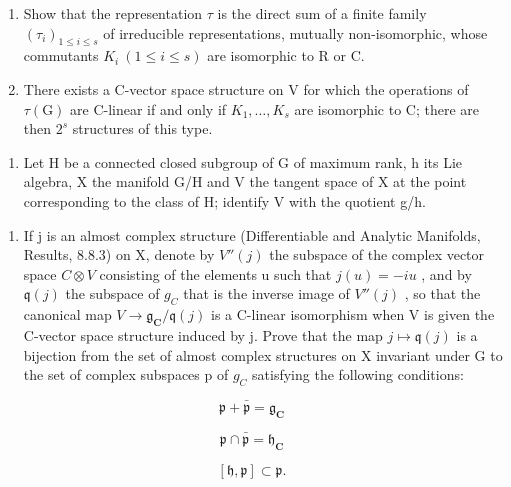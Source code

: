 \begin{enumerate}
\def\labelenumi{\alph{enumi})}
\item
  Show that the representation \(\tau\) is the direct sum of a finite family \((\tau_{i})_{1\leq i\leq s}\) of irreducible representations, mutually non-isomorphic, whose commutants \(K_{i}\ (1\leq i\leq s)\) are isomorphic to R or C.
\item
  There exists a C-vector space structure on V for which the operations of \(\tau(\mathrm{G})\) are C-linear if and only if \(K_{1},\ldots,K_{s}\) are isomorphic to C; there are then \(2^{s}\) structures of this type.
\end{enumerate}

\begin{enumerate}
\def\labelenumi{\arabic{enumi})}
\setcounter{enumi}{7}
\tightlist
\item
  Let H be a connected closed subgroup of G of maximum rank, h its Lie algebra, X the manifold G/H and V the tangent space of X at the point corresponding to the class of H; identify V with the quotient g/h.
\end{enumerate}

\begin{enumerate}
\def\labelenumi{\alph{enumi})}
\tightlist
\item
  If j is an almost complex structure (Differentiable and Analytic Manifolds, Results, 8.8.3) on X, denote by \(V''(j)\) the subspace of the complex vector space \(C \otimes V\) consisting of the elements u such that \(j(u) = -iu\) , and by \(\mathfrak{q}(j)\) the subspace of \(g_{C}\) that is the inverse image of \(V''(j)\) , so that the canonical map \(V \to \mathfrak{g}_{\mathbf{C}} / \mathfrak{q}(j)\) is a C-linear isomorphism when V is given the C-vector space structure induced by j. Prove that the map \(j \mapsto \mathfrak{q}(j)\) is a bijection from the set of almost complex structures on X invariant under G to the set of complex subspaces p of \(g_{C}\) satisfying the following conditions:
\end{enumerate}

\[
\mathfrak {p} + \bar {\mathfrak {p}} = \mathfrak {g} _ {\mathbf {C}}\tag{1}
\]

\[
\mathfrak {p} \cap \bar {\mathfrak {p}} = \mathfrak {h} _ {\mathbf {C}}\tag{2}
\]

\[
[ \mathfrak {h}, \mathfrak {p} ] \subset \mathfrak {p}.\tag{3}
\]

